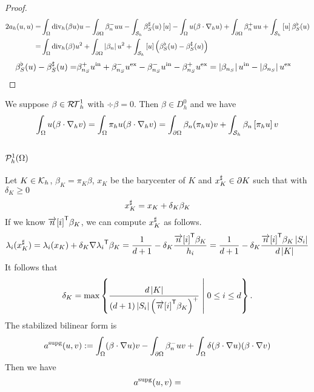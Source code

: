 \begin{proof}
%
\begin{align*}
2a_h(u,u) =& \int_{\Omega}\operatorname{div}_h(\beta u) u - \int_{\partial\Omega} \beta_n^- uu - \int_{\mathcal S_h}\beta_S^{\sharp}(u) \left[u\right]
- \int_{\Omega}u (\beta\cdot\nabla_h u) + \int_{\partial\Omega} \beta_n^+ uu + \int_{\mathcal S_h}\left[u\right]\beta_S^{\flat}(u)\\
=&\int_{\Omega}\operatorname{div}_h(\beta) u^2 + \int_{\partial\Omega} \left|\beta_n\right| u^2+ \int_{\mathcal S_h}\left[u\right]\left(\beta_S^{\flat}(u)-\beta_S^{\sharp}(u)\right)
\end{align*}
%
%
\begin{align*}
\beta_S^{\flat}(u)-\beta_S^{\sharp}(u) =&  \beta_{n_S}^{+}u^{\rm in} + \beta_{n_S}^{-}u^{\rm ex} - \beta_{n_S}^{-}u^{\rm in} - \beta_{n_S}^{+}u^{\rm ex}= \left|\beta_{n_S}\right|u^{\rm in} - \left|\beta_{n_S}\right|u^{\rm ex}
\end{align*}
%
\end{proof}
%


We suppose $\beta\in \mathcal{R\!T}^1_h$ with $\div\beta=0$. Then $\beta\in D^0_h$ and we have
%
\begin{align*}
\int_{\Omega}u (\beta\cdot\nabla_h v) = \int_{\Omega}\pi_h u (\beta\cdot\nabla_h v) = 
\int_{\partial\Omega}\beta_n (\pi_h u) v +  \int_{\mathcal S_h}\beta_n \left[\pi_h u\right] v
\end{align*}
%


%
\subsection{$\mathcal{P}^1_h(\Omega)$}\label{subsec:}
%
%
Let $K\in\mathcal K_h$, $\beta_K=\pi_K\beta$, $x_K$ be the barycenter of $K$ and $x_{K}^{\sharp}\in\partial K$ such that  with 
$\delta_K\ge0$
%
\begin{equation}\label{eq:}
x_{K}^{\sharp} = x_K + \delta_K \beta_K
\end{equation}
%
If we know ${\mathbf{\overrightarrow{n}}[i]}^{\mathsf{T}}\beta_K$, we can compute $x_{K}^{\sharp}$ as follows.
%
\begin{align*}
\lambda_i(x_{K}^{\sharp}) = \lambda_i(x_K) + \delta_K {\nabla\lambda_i}^{\mathsf{T}}\beta_K
= \frac{1}{d+1} - \delta_K \frac{{\mathbf{\overrightarrow{n}}[i]}^{\mathsf{T}}\beta_K}{h_i}
= \frac{1}{d+1} - \delta_K \frac{{\mathbf{\overrightarrow{n}}[i]}^{\mathsf{T}}\beta_K \left|S_i\right|}{d\left|K\right|}
\end{align*}
%
It follows that
%
\begin{equation}\label{eq:}
\delta_K = \max\left\{\frac{d\left|K\right|}{(d+1)\left|S_i\right|\left({\mathbf{\overrightarrow{n}}[i]}^{\mathsf{T}}\beta_K\right)^+}\;\middle|\;0\le i\le d\right\}.
\end{equation}
%
The stabilized bilinear form is
%
\begin{equation}\label{eq:}
a^{\rm supg}(u,v) := \int_{\Omega} (\beta\cdot \nabla  u) v - \int_{\partial\Omega} \beta_n^- uv + \int_{\Omega} \delta(\beta\cdot \nabla u)( \beta\cdot \nabla v)
\end{equation}
%
Then we have
%
\begin{align*}
a^{\rm supg}(u,v) = 
\end{align*}
%



\printbibliography[title=References Section~\thesection]

